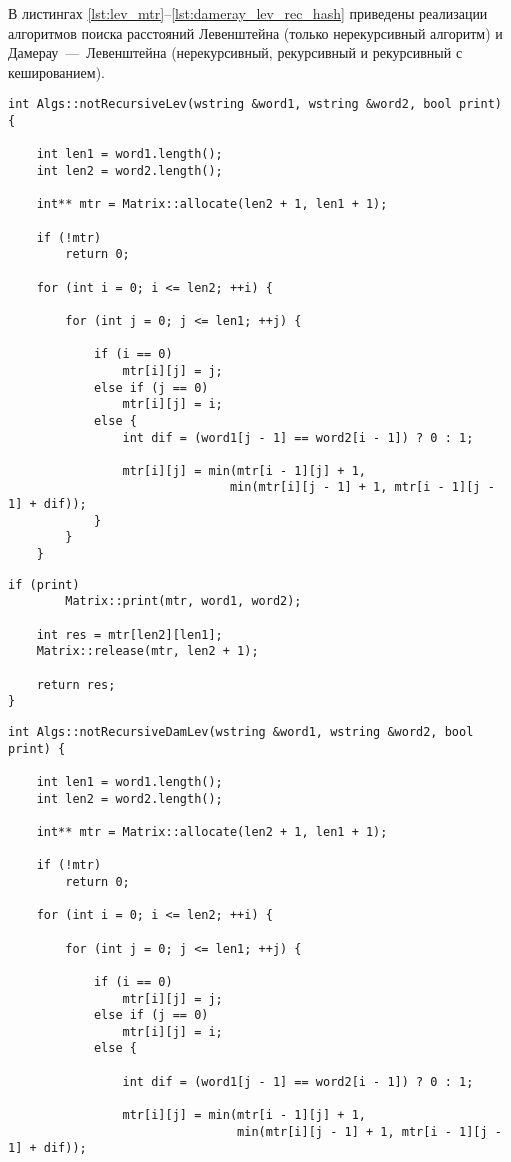 В листингах \ref{lst:lev_mtr}--\ref{lst:dameray_lev_rec_hash} приведены реализации алгоритмов поиска расстояний Левенштейна (только нерекурсивный алгоритм) и Дамерау~---~Левенштейна (нерекурсивный, рекурсивный и рекурсивный с кешированием).

\begin{lstlisting}[label=lst:lev_mtr,caption=Функция нахождения расстояния Левенштейна с использованием матрицы (начало)]
int Algs::notRecursiveLev(wstring &word1, wstring &word2, bool print) {
    
    int len1 = word1.length();
    int len2 = word2.length();

    int** mtr = Matrix::allocate(len2 + 1, len1 + 1);

    if (!mtr)
        return 0;

    for (int i = 0; i <= len2; ++i) {

        for (int j = 0; j <= len1; ++j) {

            if (i == 0)
                mtr[i][j] = j;
            else if (j == 0)
                mtr[i][j] = i;
            else {
                int dif = (word1[j - 1] == word2[i - 1]) ? 0 : 1;

                mtr[i][j] = min(mtr[i - 1][j] + 1, 
                               min(mtr[i][j - 1] + 1, mtr[i - 1][j - 1] + dif));
            }
        }
    }
\end{lstlisting}

\clearpage

\begin{lstlisting}[label=lst:lev_mtr,caption=Функция нахождения расстояния Левенштейна с использованием матрицы (конец)]
    if (print)  
        Matrix::print(mtr, word1, word2);

    int res = mtr[len2][len1];
    Matrix::release(mtr, len2 + 1);

    return res;
}
\end{lstlisting}

\begin{lstlisting}[label=lst:dameray_lev_rec,caption=Функция нахождения расстояния Дамерау~---~Левенштейна с использованием матрицы (начало)]
int Algs::notRecursiveDamLev(wstring &word1, wstring &word2, bool print) {

    int len1 = word1.length();
    int len2 = word2.length();

    int** mtr = Matrix::allocate(len2 + 1, len1 + 1);

    if (!mtr)
        return 0;

    for (int i = 0; i <= len2; ++i) {

        for (int j = 0; j <= len1; ++j) {

            if (i == 0)
                mtr[i][j] = j;
            else if (j == 0)
                mtr[i][j] = i;
            else {

                int dif = (word1[j - 1] == word2[i - 1]) ? 0 : 1;

                mtr[i][j] = min(mtr[i - 1][j] + 1, 
                                min(mtr[i][j - 1] + 1, mtr[i - 1][j - 1] + dif));
\end{lstlisting}


